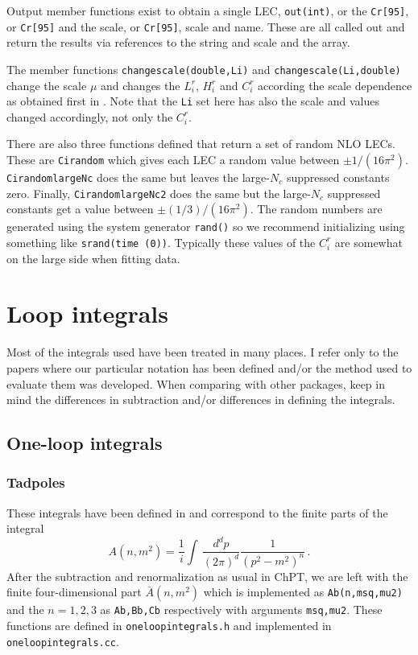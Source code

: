 \documentclass[12pt,a4paper]{article}
\begin{document}
Output member functions exist to obtain a single LEC, \texttt{out(int)},
or the \texttt{Cr[95]}, or \texttt{Cr[95]} and the scale, or  \texttt{Cr[95]},
scale and name.
These are all called out and return the results via references
to the string and scale and the array.

The member functions \texttt{changescale(double,Li)}
and \texttt{changescale(Li,double)} change the scale $\mu$ and changes
the $L_i^r$, $H_i^r$ and $C_i^r$ according the scale dependence as obtained
first in \cite{Bijnens:1999hw}. Note that the \texttt{Li} set here has also the
scale and values changed accordingly, not only the $C_i^r$.

There are also three functions defined that return a set of random NLO LECs.
These are \texttt{Cirandom} which gives each LEC a random value between
$\pm1/(16\pi^2)$. \texttt{CirandomlargeNc} does the same but leaves
the large-$N_c$ suppressed constants zero.
 Finally, \texttt{CirandomlargeNc2} does the same but the large-$N_c$
suppressed constants get a value between $\pm(1/3)/(16\pi^2)$.
The random numbers are generated using the system
generator \texttt{rand()} so we recommend initializing using something like
\texttt{srand(time (0))}. Typically these values of the $C_i^r$ are somewhat
on the large side when fitting data.

\section{Loop integrals}
\label{loopintegrals}

Most of the integrals used have been treated in many places.
I refer only to the papers where our particular notation has been defined
and/or the method used to evaluate them was developed.
When comparing with other packages, keep in mind the differences in
subtraction and/or differences in defining the integrals.

\subsection{One-loop integrals}
\label{oneloop}

\subsubsection{Tadpoles}
\label{tadpoles}

These integrals have been defined in \cite{Amoros:1999dp} and correspond to
the finite parts of the integral
\begin{equation}
A(n,m^2) = \frac{1}{i}\int\,\frac{d^dp}{(2\pi)^d}\frac{1}{(p^2-m^2)^n}\,.
\end{equation}
After the subtraction and renormalization as usual in ChPT, we are left
with the finite four-dimensional part $\bar A(n,m^2)$ which is implemented
as \texttt{Ab(n,msq,mu2)} and the $n=1,2,3$ as \texttt{Ab,Bb,Cb} respectively
with arguments \texttt{msq,mu2}.
These functions are defined in \texttt{oneloopintegrals.h}
and implemented in \texttt{oneloopintegrals.cc}. 
\end{document}
